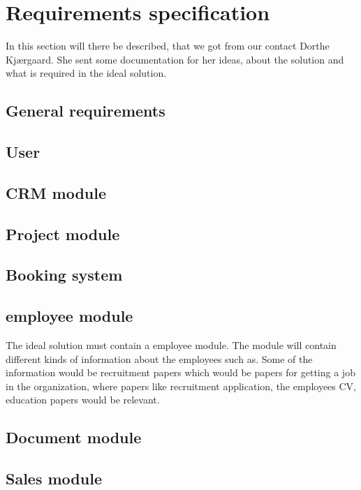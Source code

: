 \section{Requirements specification}
In this section will there be described, that we got from our contact Dorthe Kjærgaard. She sent some documentation for her ideas, about the solution and what is required in the ideal solution. 

\subsection{General requirements}


\subsection{User}


\subsection{CRM module}

\subsection{Project module}

\subsection{Booking system}

\subsection{employee module}
The ideal solution must contain a employee module. The module will contain different kinds of information about the employees such as. Some of the information would be recruitment papers which would be papers for getting a job in the organization, where papers like recruitment application, the employees CV, education papers would be relevant. 

\subsection{Document module}

\subsection{Sales module}




